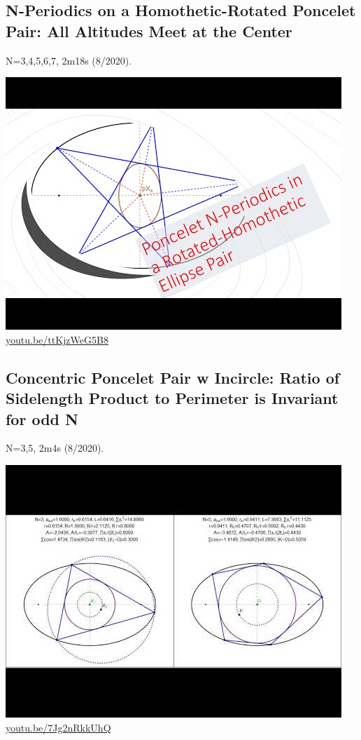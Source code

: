 \documentclass[12pt]{amsart}
\begin{document}
\subsection{N-Periodics on a Homothetic-Rotated Poncelet Pair: All Altitudes Meet at the Center}
\label{vid:ttKjzWeG5B8}
\noindent N=3,4,5,6,7, 2m18s (8/2020). 
\begin{center}\includegraphics[width=.5\textwidth]{pics/ttKjzWeG5B8.jpg} \\ 
\href{https://youtu.be/ttKjzWeG5B8}{\url{youtu.be/ttKjzWeG5B8}}\end{center}
% 

\subsection{Concentric Poncelet Pair w Incircle: Ratio of Sidelength Product to Perimeter is Invariant for odd N}
\label{vid:7Jg2nRkkUhQ}
\noindent N=3,5, 2m4s (8/2020). 
\begin{center}\includegraphics[width=.5\textwidth]{pics/7Jg2nRkkUhQ.jpg} \\ 
\href{https://youtu.be/7Jg2nRkkUhQ}{\url{youtu.be/7Jg2nRkkUhQ}}\end{center}
% 
\end{document}
